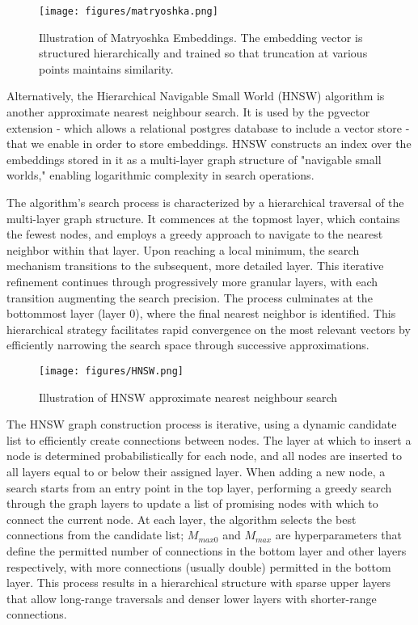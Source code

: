 \documentclass[a4paper, oneside]{discothesis}
\begin{document}
\begin{figure}[h]
\centering
\texttt{[image: figures/matryoshka.png]}
\caption{Illustration of Matryoshka Embeddings. The embedding vector is structured hierarchically and trained so that truncation at various points maintains similarity.}
\label{fig:matryoshka_embeddings}
\end{figure}

Alternatively, the Hierarchical Navigable Small World (HNSW) algorithm \cite{malkov2018efficient} is another approximate nearest neighbour search. It is used by the pgvector extension - which allows a relational postgres database to include a vector store - that we enable in order to store embeddings. HNSW constructs an index over the embeddings stored in it as a multi-layer graph structure of "navigable small worlds," enabling logarithmic complexity in search operations.

The algorithm's search process is characterized by a hierarchical traversal of the multi-layer graph structure. It commences at the topmost layer, which contains the fewest nodes, and employs a greedy approach to navigate to the nearest neighbor within that layer. Upon reaching a local minimum, the search mechanism transitions to the subsequent, more detailed layer. This iterative refinement continues through progressively more granular layers, with each transition augmenting the search precision. The process culminates at the bottommost layer (layer 0), where the final nearest neighbor is identified. This hierarchical strategy facilitates rapid convergence on the most relevant vectors by efficiently narrowing the search space through successive approximations.

\begin{figure}[h]
    \centering
    \texttt{[image: figures/HNSW.png]}
    \caption{Illustration of HNSW approximate nearest neighbour search}
    \label{fig:hnsw_structure}
    \end{figure}

The HNSW graph construction process is iterative, using a dynamic candidate list to efficiently create connections between nodes. The layer at which to insert a node is determined probabilistically for each node, and all nodes are inserted to all layers equal to or below their assigned layer. When adding a new node, a search starts from an entry point in the top layer, performing a greedy search through the graph layers to update a list of promising nodes with which to connect the current node. At each layer, the algorithm selects the best connections from the candidate list; $M_{max0}$ and $M_{max}$ are hyperparameters that define the permitted number of connections in the bottom layer and other layers respectively, with more connections (usually double) permitted in the bottom layer. This process results in a hierarchical structure with sparse upper layers that allow long-range traversals and denser lower layers with shorter-range connections.
\end{document}
